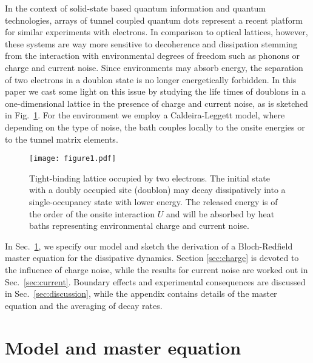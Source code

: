 \documentclass[twocolumn,prb,showpacs]{revtex4-1}
\begin{document}
In the context of solid-state based quantum information and quantum
technologies, arrays of tunnel coupled quantum dots represent a recent platform
for similar experiments with electrons.\cite{Puddy2015a, Zajak2016a}  In
comparison to optical lattices, however, these systems are way more
sensitive to decoherence and dissipation stemming from the interaction with
environmental degrees of freedom such as phonons or charge and current
noise.  Since environments may absorb energy, the separation of two
electrons in a doublon state is no longer energetically forbidden.  In this
paper we cast some light on this issue by studying the life times of
doublons in a one-dimensional lattice in the presence of charge and current
noise, as is sketched in Fig.~\ref{fig:setup}.  For the environment we
employ a Caldeira-Leggett model, \cite{Leggett1987a, Hanggi1990a} where
depending on the type of noise, the bath couples locally to the onsite
energies or to the tunnel matrix elements.

\begin{figure}[t]
    \centering\texttt{[image: figure1.pdf]}
    \caption{Tight-binding lattice occupied by two electrons.  The
    initial state with a doubly occupied site (doublon) may decay dissipatively
    into a single-occupancy state with lower energy.  The released energy
    is of the order of the onsite interaction $U$ and will be absorbed by
    heat baths representing environmental charge and current noise.
\label{fig:setup}
}
\end{figure}

In Sec.~\ref{sec:model}, we specify our model and sketch the derivation of
a Bloch-Redfield master equation for the dissipative dynamics.  Section
\ref{sec:charge} is devoted to the influence of charge noise, while the
results for current noise are worked out in Sec.~\ref{sec:current}.
Boundary effects and experimental consequences are discussed in
Sec.~\ref{sec:discussion}, while the appendix contains details of the
master equation and the averaging of decay rates.

\section{Model and master equation}
\label{sec:model}
\end{document}
